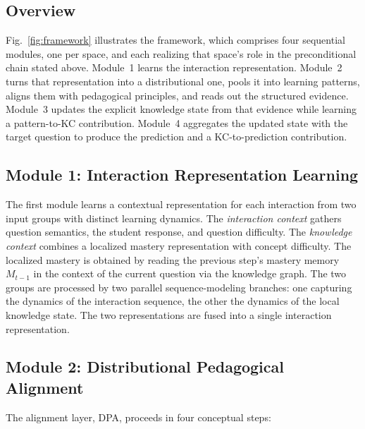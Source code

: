 \documentclass[conference]{IEEEtran}
\begin{document}
\subsection{Overview}

Fig.~\ref{fig:framework} illustrates the framework, which comprises four sequential modules, one per space, and each realizing that space's role in the preconditional chain stated above. Module~1 learns the interaction representation. Module~2 turns that representation into a distributional one, pools it into learning patterns, aligns them with pedagogical principles, and reads out the structured evidence. Module~3 updates the explicit knowledge state from that evidence while learning a pattern-to-KC contribution. Module~4 aggregates the updated state with the target question to produce the prediction and a KC-to-prediction contribution.

\subsection{Module 1: Interaction Representation Learning}
\label{sec:irl}

The first module learns a contextual representation for each interaction from two input groups with distinct learning dynamics. The \emph{interaction context} gathers question semantics, the student response, and question difficulty. The \emph{knowledge context} combines a localized mastery representation with concept difficulty. The localized mastery is obtained by reading the previous step's mastery memory $M_{t-1}$ in the context of the current question via the knowledge graph. The two groups are processed by two parallel sequence-modeling branches: one capturing the dynamics of the interaction sequence, the other the dynamics of the local knowledge state. The two representations are fused into a single interaction representation.

\subsection{Module 2: Distributional Pedagogical Alignment}
\label{sec:dpa}

The alignment layer, DPA, proceeds in four conceptual steps:
\end{document}
